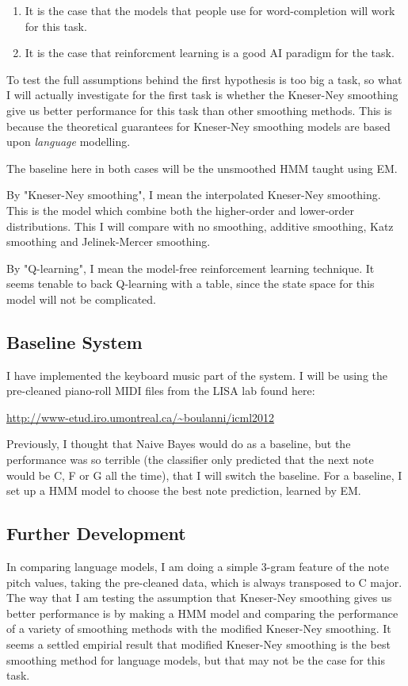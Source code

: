 \documentclass{article}
\begin{document}
\begin{enumerate}
    \item It is the case that the models that people use for word-completion will work for this task.
    \item It is the case that reinforcment learning is a good AI paradigm for the task.
\end{enumerate}

To test the full assumptions behind the first hypothesis is too big a task, so what I will actually investigate for the first task is whether the Kneser-Ney smoothing give us better performance for this task than other smoothing methods. This is because the theoretical guarantees for Kneser-Ney smoothing models are based upon \emph{language} modelling.

The baseline here in both cases will be the unsmoothed HMM taught using EM. 

By "Kneser-Ney smoothing", I mean the interpolated Kneser-Ney smoothing. This is the model which combine both the higher-order and lower-order distributions. This I will compare with no smoothing, additive smoothing, Katz smoothing and Jelinek-Mercer smoothing.

By "Q-learning", I mean the model-free reinforcement learning technique. It seems tenable to back Q-learning with a table, since the state space for this model will not be complicated.

\subsection*{Baseline System}
I have implemented the keyboard music part of the system. I will be using the pre-cleaned piano-roll MIDI files from the LISA lab found here:

\url{http://www-etud.iro.umontreal.ca/~boulanni/icml2012}

Previously, I thought that Naive Bayes would do as a baseline, but the performance was so terrible (the classifier only predicted that the next note would be C, F or G all the time), that I will switch the baseline. For a baseline, I set up a HMM model to choose the best note prediction, learned by EM.

\subsection*{Further Development}
In comparing language models, I am doing a simple 3-gram feature of the note pitch values, taking the pre-cleaned data, which is always transposed to C major. The way that I am testing the assumption that Kneser-Ney smoothing gives us better performance is by making a HMM model and comparing the performance of a variety of smoothing methods with the modified Kneser-Ney smoothing. It seems a settled empirial result that modified Kneser-Ney smoothing is the best smoothing method for language models, but that may not be the case for this task.
\end{document}

